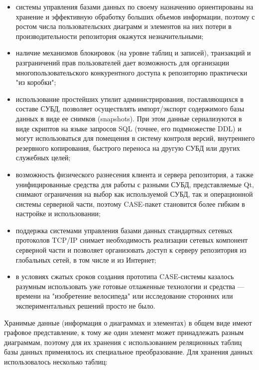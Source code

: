 \documentclass[a5paper]{article}
\begin{document}
\begin{itemize}
  \item системы управления базами данных по своему назначению ориентированы на
	хранение и эффективную обработку больших объемов информации, поэтому с
	ростом числа пользовательских диаграмм и элементов на них потери в
	производительности репозитория окажутся незначительными;
  \item наличие механизмов блокировок (на уровне таблиц и записей), транзакций и
	разграничений прав пользователей дает возможность для организации
	многопользовательского конкурентного доступа к репозиторию практически
	"из коробки";
  \item использование простейших утилит администрирования, поставляющихся в
	составе СУБД, позволяет осуществлять импорт/экспорт содержимого базы
	данных в виде ее снимков (snapshots). При
	этом данные сериализуются в виде скриптов на языке запросов
	SQL (точнее, его подмножестве DDL) и могут использоваться для помещения в
	систему контроля версий, внутреннего резервного копирования, быстрого
	переноса на другую СУБД или других служебных целей;
  \item возможность физического разнесения клиента и сервера репозитория, а
	также унифицированные средства для работы с разными СУБД,
	представляемые Qt, снимают
	ограничения на выбор как используемой СУБД, так и операционной системы
	серверной части, поэтому CASE-пакет
	становится более гибким в настройке и использовании;
  \item поддержка системами управления базами данных стандартных сетевых
	протоколов TCP/IP снимает необходимость реализации сетевых компонент серверной части и
	позволяет организовать доступ к серверу репозитория из глобальных
	сетей, в том числе и из Интернет;
  \item в условиях сжатых сроков создания прототипа
	CASE-системы казалось разумным использовать уже готовые отлаженные технологии и средства 
	--- времени на "изобретение велосипеда" или исследование сторонних или
	экспериментальных решений просто не было.
\end{itemize}

Хранимые данные (информация о диаграммах и элементах) в общем виде имеют
графовое представление, к тому же один элемент может принадлежать
разным диаграммам, поэтому для их хранения с использованием реляционных
таблиц базы данных применялось их специальное преобразование. Для
хранения данных использовалось несколько таблиц:
\end{document}
